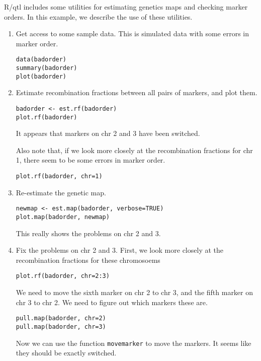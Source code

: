 \documentclass[10pt,letterpaper]{article}
\newcommand{\usercolor}{\color [named]{BlueViolet}}
\begin{document}
\noindent R/qtl includes some utilities for estimating genetics maps
and checking marker orders.  In this example, we describe the use of
these utilities.

\begin{enumerate}

\item Get access to some sample data.  This is simulated data with
some errors in marker order.

\usercolor 
\verb|data(badorder)|  \\
\verb|summary(badorder)| \\
\verb|plot(badorder)|
\normalcolor

\item Estimate recombination fractions between all pairs of markers,
and plot them. 

\usercolor \verb|badorder <- est.rf(badorder)| \\
\verb|plot.rf(badorder)| \normalcolor

It appears that markers on chr 2 and 3 have been switched.

Also note that, if we look more closely at the recombination fractions
for chr 1, there seem to be some errors in marker order.

\usercolor \verb|plot.rf(badorder, chr=1)| \normalcolor

\item Re-estimate the genetic map.  

\usercolor
\verb|newmap <- est.map(badorder, verbose=TRUE)| \\
\verb|plot.map(badorder, newmap)|
\normalcolor

This really shows the problems on chr 2 and 3.

\item Fix the problems on chr 2 and 3.
First, we look more closely at the recombination fractions for these
chromosoems

\usercolor \verb|plot.rf(badorder, chr=2:3)| \normalcolor

We need to move the sixth marker on chr 2 to chr 3, and
the fifth marker on chr 3 to chr 2.  We need to figure
out which markers these are.

\usercolor
\verb|pull.map(badorder, chr=2)| \\
\verb|pull.map(badorder, chr=3)| 
\normalcolor

Now we can use the function \verb-movemarker- to move the markers.
It seems like they should be exactly switched.


\end{enumerate}
\end{document}
